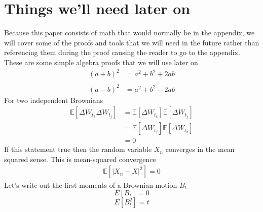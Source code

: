 \documentclass{article}
\begin{document}
\section*{Things we'll need later on}
Because this paper consists of math that would normally be in the appendix, we will cover some of the proofs and tools that we will need in the future rather than referencing them during the proof causing the reader to go to the appendix. 
\newline
\newline
These are some simple algebra proofs that we will use later on 
\begin{equation} \label{eq1}
\begin{split}
(a+b)^2 & = a^2 + b^2 + 2ab\\
\end{split}
\end{equation}
\begin{equation} \label{eq1}
\begin{split}
(a-b)^2 & = a^2 + b^2 -2ab
\end{split}
\end{equation}
For two independent Brownians
\begin{equation} \label{eq1}
\begin{split}
\mathbb{E}[\Delta W_{t_k} \Delta W_{t_j}] & = \mathbb{E}[\Delta W_{t_k}] \mathbb{E}[\Delta W_{t_j}]\\
 & = \mathbb{E}[\Delta W_{t_j}]\mathbb{E}[\Delta W_{t_k}] \\
 & = 0
\end{split}
\end{equation}
If this statement true then the random variable $X_n$ converges in the mean squared sense. This is mean-squared convergence
\begin{equation} \label{eq1}
\begin{split}
\mathbb{E}[|X_n - X|^2] = 0 
\end{split}
\end{equation}
Let's write out the first moments of a Brownian motion $B_t$
$$
E[B_t] = 0
$$
$$
E[B_t^2] = t
$$
\end{document}
